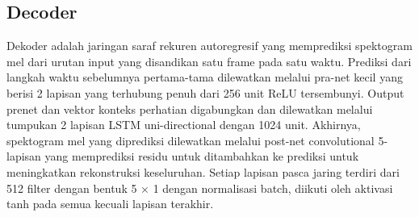 \subsection{Decoder}
Dekoder adalah jaringan saraf rekuren autoregresif yang memprediksi spektogram mel dari urutan input yang disandikan satu frame pada satu waktu. Prediksi dari langkah waktu sebelumnya pertama-tama dilewatkan melalui pra-net kecil yang berisi 2 lapisan yang terhubung penuh dari 256 unit ReLU tersembunyi. Output prenet dan vektor konteks perhatian digabungkan dan dilewatkan melalui tumpukan 2 lapisan LSTM uni-directional dengan 1024 unit. Akhirnya, spektogram mel yang diprediksi dilewatkan melalui post-net convolutional 5-lapisan yang memprediksi residu untuk ditambahkan ke prediksi untuk meningkatkan rekonstruksi keseluruhan. Setiap lapisan pasca jaring terdiri dari 512 filter dengan bentuk 5 × 1 dengan normalisasi batch, diikuti oleh aktivasi tanh pada semua kecuali lapisan terakhir\cite{DBLP:journals/corr/abs-1712-05884,9289599}.


